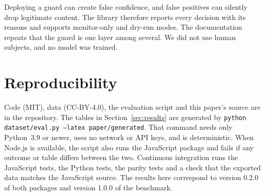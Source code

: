 \documentclass[10pt]{article}
\begin{document}
Deploying a guard can create false confidence, and false positives can silently drop legitimate content. The library therefore reports every decision with its reasons and supports monitor-only and dry-run modes. The documentation repeats that the guard is one layer among several. We did not use human subjects, and no model was trained.

\section{Reproducibility}
Code (MIT), data (CC-BY-4.0), the evaluation script and this paper's source are in the repository. The tables in Section~\ref{sec:results} are generated by \texttt{python dataset/eval.py --latex paper/generated}. That command needs only Python~3.9 or newer, uses no network or API keys, and is deterministic. When Node.js is available, the script also runs the JavaScript package and fails if any outcome or table differs between the two. Continuous integration runs the JavaScript tests, the Python tests, the parity tests and a check that the exported data matches the JavaScript source. The results here correspond to version 0.2.0 of both packages and version 1.0.0 of the benchmark.



\end{document}
